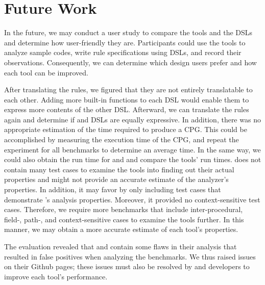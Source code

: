 \chapter{Future Work}
\label{ch:fwork}
In the future, we may conduct a user study to compare the tools and the DSLs and determine how user-friendly they are. Participants could use the tools to analyze sample codes, write rule specifications using DSLs, and record their observations. Consequently, we can determine which design users prefer and how each tool can be improved.

After translating the rules, we figured that they are not entirely translatable to each other. Adding more built-in functions to each DSL would enable them to express more contents of the other DSL. Afterward, we can translate the rules again and determine if \MARK{} and \crysl{} DSLs are equally expressive.
In addition, there was no appropriate estimation of the time required to produce a CPG. This could be accomplished by measuring the execution time of the CPG, and repeat the experiment for all benchmarks to determine an average time. In the same way, we could also obtain the run time for \cognicryptsast{} and \codyze{} and compare the tools' run times. \cryptoapibench{} does not contain many test cases to examine the tools into finding out their actual properties and might not provide an accurate estimate of the analyzer's properties. In addition, it may favor \cryptoguard{} by only including test cases that demonstrate \cryptoguard's analysis properties. Moreover, it provided no context-sensitive test cases. Therefore, we require more benchmarks that include inter-procedural, field-, path-, and context-sensitive cases to examine the tools further. In this manner, we may obtain a more accurate estimate of each tool's properties.

The evaluation revealed that \codyze{} and \cognicryptsast{} contain some flaws in their analysis that resulted in false positives when analyzing the benchmarks. We thus raised issues on their Github pages; these issues must also be resolved by \codyze{} and \cognicryptsast{} developers to improve each tool's performance.


